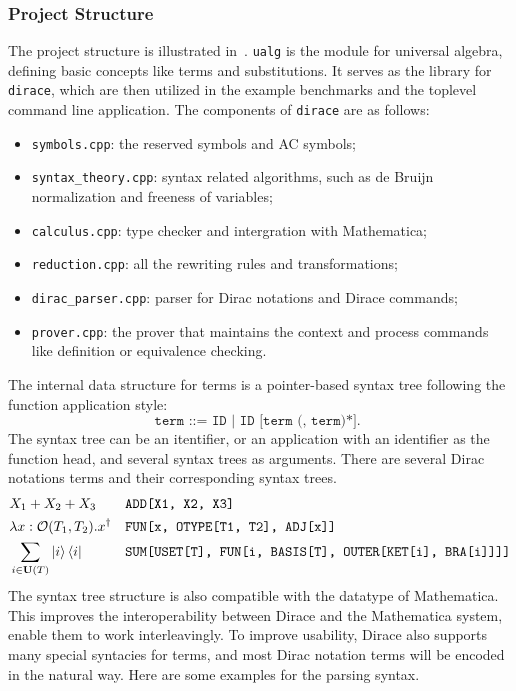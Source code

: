 \documentclass[runningheads]{llncs}
\begin{document}
\subsubsection{Project Structure}
The project structure is illustrated in~.
\texttt{ualg} is the module for universal algebra, defining basic concepts like terms and substitutions. It serves as the library for \texttt{dirace}, which are then utilized in the example benchmarks and the toplevel command line application. The components of \texttt{dirace} are as follows:

\begin{itemize}
    \item \texttt{symbols.cpp}: the reserved symbols and AC symbols;
    \item \texttt{syntax\_theory.cpp}: syntax related algorithms, such as de Bruijn normalization and freeness of variables;
    \item \texttt{calculus.cpp}: type checker and intergration with Mathematica;
    \item \texttt{reduction.cpp}: all the rewriting rules and transformations;
    \item \texttt{dirac\_parser.cpp}: parser for Dirac notations and Dirace commands;
    \item \texttt{prover.cpp}: the prover that maintains the context and process commands like definition or equivalence checking.
\end{itemize}



The internal data structure for terms is a pointer-based syntax tree following the function application style:
\[
    \texttt{
        term ::= ID | ID [term (, term)*].
    }
\]
The syntax tree can be an itentifier, or an application with an identifier as the function head, and several syntax trees as arguments. There are several Dirac notations terms and their corresponding syntax trees.
\footnotesize{
\begin{align*}
    & X_1 + X_2 + X_3 && \texttt{ADD[X1, X2, X3]} 
    \\
    & \lambda x: \mathcal{O}(T_1,  T_2). x^\dagger && \texttt{FUN[x, OTYPE[T1, T2], ADJ[x]]}
    \\
    & \sum_{i \in \mathbf{U}(T)} \ket{i} \bra{i} && \texttt{SUM[USET[T], FUN[i, BASIS[T], OUTER[KET[i], BRA[i]]]]}
\end{align*}
}
The syntax tree structure is also compatible with the datatype of Mathematica. This improves the interoperability between Dirace and the Mathematica system, enable them to work interleavingly.
To improve usability, Dirace also supports many special syntacies for terms,  and most Dirac notation terms will be encoded in the natural way.
Here are some examples for the parsing syntax.
\end{document}
